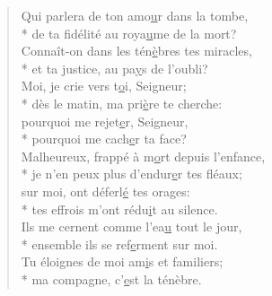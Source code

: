 \begin{verse}
Qui parlera de ton amo\underline{u}r dans la tombe, \\*
de ta fidélité au roya\underline{u}me de la mort? \\
Connaît-on dans les tén\underline{è}bres tes miracles, \\*
et ta justice, au pa\underline{y}s de l’oubli? \\

Moi, je crie vers t\underline{o}i, Seigneur; \\*
dès le matin, ma pri\underline{è}re te cherche: \\
pourquoi me rejet\underline{e}r, Seigneur, \\*
pourquoi me cach\underline{e}r ta face? \\

Malheureux, frappé à m\underline{o}rt depuis l’enfance, \\*
je n’en peux plus d’endur\underline{e}r tes fléaux; \\
sur moi, ont déferl\underline{é} tes orages: \\*
tes effrois m’ont rédu\underline{i}t au silence. \\

Ils me cernent comme l’ea\underline{u} tout le jour, \\*
ensemble ils se ref\underline{e}rment sur moi. \\
Tu éloignes de moi am\underline{i}s et familiers; \\*
ma compagne, c’\underline{e}st la ténèbre. \\
\end{verse}

